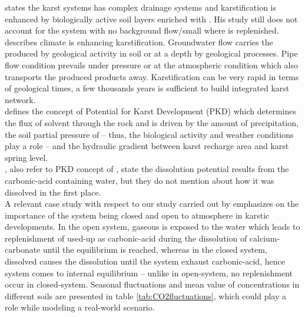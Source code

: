 \citet{bonacci2001analysis} states the karst systems has complex drainage systems and karstification is enhanced by biologically active soil layers enriched with . His study still does not account for the system with no background flow/small where  is replenished. \\

\citet{bakalowicz2005karst} describes climate is enhancing karstification. Groundwater flow carries the produced  by geological activity in soil or at a depth by geological processes. Pipe flow condition prevails under pressure or at the atmospheric condition which also transports the produced products away. Karstification can be very rapid in terms of geological times, a few thousands years is sufficient to build integrated karst network.\\

\citet{mangin1975contribution} defines the concept of Potential for Karst Development (PKD) which determines the flux of solvent through the rock and is driven by the amount of precipitation, the soil partial pressure of  -- thus, the biological activity and weather conditions play a role -- and the hydraulic gradient between karst recharge area and karst spring level. \\

\citet{mohammadi2007method}, also refer to PKD concept of \citet{mangin1975contribution}, state the dissolution potential results from the carbonic-acid containing water, but they do not mention about how it was dissolved in the first place. \\

A relevant case study with respect to our study carried out by \citet{atkinson1977carbon} emphasizes on the importance of the system being closed and open to atmosphere in karstic developments. In the open system, gaseous  is exposed to the water which leads to replenishment of used-up  as carbonic-acid during the dissolution of calcium-carbonate until the equilibrium is reached, whereas in the closed system, dissolved  causes the dissolution until the system exhaust carbonic-acid, hence system comes to internal equilibrium -- unlike in open-system, no replenishment occur in closed-system. Seasonal fluctuations and mean value of  concentrations in different soils are presented in table \ref{tab:CO2fluctuations}, which could play a role while modeling a real-world scenario. \\

